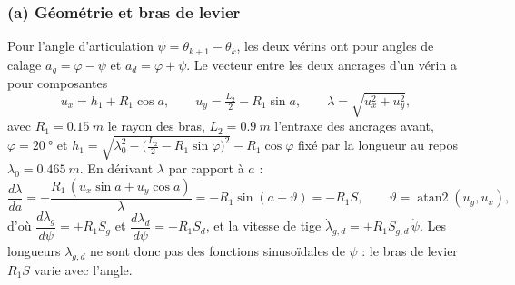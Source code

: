 \documentclass[11pt,a4paper]{article}
\newcommand{\dt}[1]{\dot{#1}}
\begin{document}
\subsubsection*{(a) Géométrie et bras de levier}
Pour l'angle d'articulation $\psi=\theta_{k+1}-\theta_k$, les deux vérins ont pour angles de calage $a_g=\varphi-\psi$ et $a_d=\varphi+\psi$. Le vecteur entre les deux ancrages d'un vérin a pour composantes
\begin{equation}
 u_x=h_1+R_1\cos a,\qquad u_y=\tfrac{L_2}{2}-R_1\sin a,\qquad \lambda=\sqrt{u_x^2+u_y^2},
\end{equation}
avec $R_1=\SI{0,15}{m}$ le rayon des bras, $L_2=\SI{0,9}{m}$ l'entraxe des ancrages avant, $\varphi=\SI{20}{\degree}$ et $h_1=\sqrt{\lambda_0^2-\big(\tfrac{L_2}2-R_1\sin\varphi\big)^2}-R_1\cos\varphi$ fixé par la longueur au repos $\lambda_0=\SI{0,465}{m}$. En dérivant $\lambda$ par rapport à $a$ :
\begin{equation}
 \frac{d\lambda}{da}=-\frac{R_1\,(u_x\sin a+u_y\cos a)}{\lambda}=-R_1\sin(a+\vartheta)=-R_1S,\qquad \vartheta=\operatorname{atan2}(u_y,u_x),
\end{equation}
d'où $\dfrac{d\lambda_g}{d\psi}=+R_1S_g$ et $\dfrac{d\lambda_d}{d\psi}=-R_1S_d$, et la vitesse de tige $\dt\lambda_{g,d}=\pm R_1S_{g,d}\,\dt\psi$. Les longueurs $\lambda_{g,d}$ ne sont donc pas des fonctions sinusoïdales de $\psi$ : le bras de levier $R_1S$ varie avec l'angle.
\end{document}
